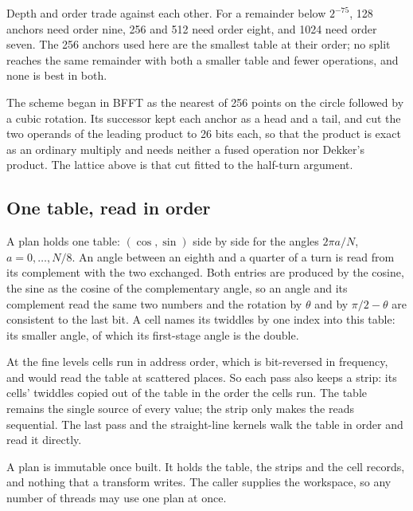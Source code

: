 \documentclass[conference]{IEEEtran}
\begin{document}
Depth and order trade against each other.
For a remainder below $2^{-75}$, 128 anchors need order nine, 256 and 512 need order eight, and 1024 need order seven.
The 256 anchors used here are the smallest table at their order; no split reaches the same remainder with both a smaller table and fewer operations, and none is best in both.

The scheme began in BFFT as the nearest of 256 points on the circle followed by a cubic rotation.
Its successor kept each anchor as a head and a tail, and cut the two operands of the leading product to 26 bits each, so that the product is exact as an ordinary multiply and needs neither a fused operation nor Dekker's product.
The lattice above is that cut fitted to the half-turn argument.

\subsection{One table, read in order}\label{sec:table}

A plan holds one table: $(\cos,\sin)$ side by side for the angles $2\pi a/N$, $a=0,\dots,N/8$.
An angle between an eighth and a quarter of a turn is read from its complement with the two exchanged.
Both entries are produced by the cosine, the sine as the cosine of the complementary angle, so an angle and its complement read the same two numbers and the rotation by $\theta$ and by $\pi/2-\theta$ are consistent to the last bit.
A cell names its twiddles by one index into this table: its smaller angle, of which its first-stage angle is the double.

At the fine levels cells run in address order, which is bit-reversed in frequency, and would read the table at scattered places.
So each pass also keeps a strip: its cells' twiddles copied out of the table in the order the cells run.
The table remains the single source of every value; the strip only makes the reads sequential.
The last pass and the straight-line kernels walk the table in order and read it directly.

A plan is immutable once built.
It holds the table, the strips and the cell records, and nothing that a transform writes.
The caller supplies the workspace, so any number of threads may use one plan at once.
\end{document}
